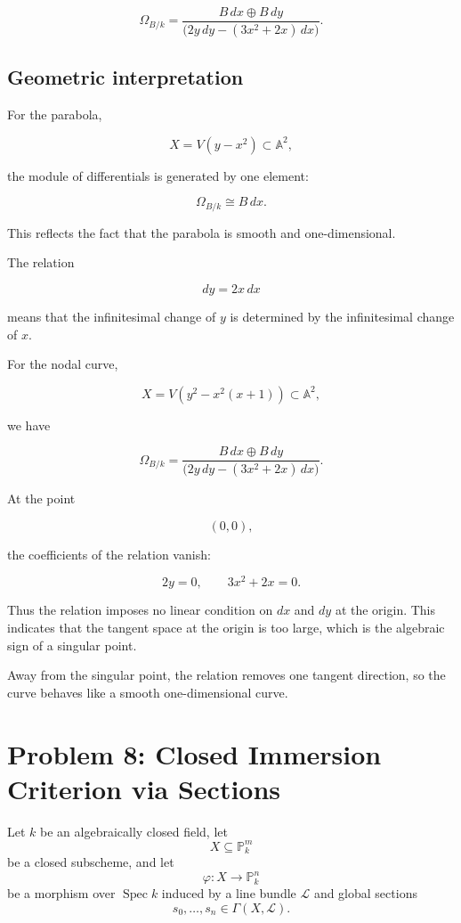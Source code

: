 \documentclass[12pt,a4paper]{article}
\theoremstyle{notespace}
\begin{document}
\[
\Omega_{B/k}
=
\frac{B\,dx\oplus B\,dy}
{\bigl(2y\,dy-(3x^2+2x)\,dx\bigr)}.
\]

\subsection{Geometric interpretation}

For the parabola,

\[
X=V(y-x^2)\subset \mathbb A^2,
\]

the module of differentials is generated by one element:

\[
\Omega_{B/k}\cong B\,dx.
\]

This reflects the fact that the parabola is smooth and one-dimensional.

The relation

\[
dy=2x\,dx
\]

means that the infinitesimal change of \(y\) is determined by the infinitesimal change of \(x\).

For the nodal curve,

\[
X=V(y^2-x^2(x+1))\subset \mathbb A^2,
\]

we have

\[
\Omega_{B/k}
=
\frac{B\,dx\oplus B\,dy}
{\bigl(2y\,dy-(3x^2+2x)\,dx\bigr)}.
\]

At the point

\[
(0,0),
\]

the coefficients of the relation vanish:

\[
2y=0,
\qquad
3x^2+2x=0.
\]

Thus the relation imposes no linear condition on \(dx\) and \(dy\) at the origin. This indicates that the tangent space at the origin is too large, which is the algebraic sign of a singular point.

Away from the singular point, the relation removes one tangent direction, so the curve behaves like a smooth one-dimensional curve.

\section{Problem 8: Closed Immersion Criterion via Sections}

Let $k$ be an algebraically closed field, let
\[
X\subseteq \mathbb P_k^m
\]
be a closed subscheme, and let
\[
\varphi:X\to \mathbb P_k^n
\]
be a morphism over $\operatorname{Spec}k$ induced by a line bundle
$\mathcal L$ and global sections
\[
s_0,\ldots,s_n\in \Gamma(X,\mathcal L).
\]
\end{document}
